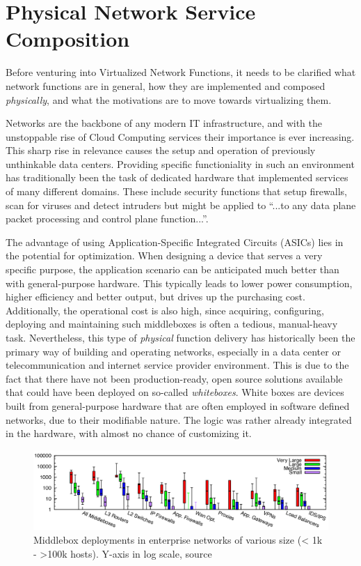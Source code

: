 \section{Physical Network Service Composition}
\label{sec:physical}
Before venturing into Virtualized Network Functions, it needs to be clarified what network functions are in general, how they are implemented and composed \textit{physically}, and what the motivations are to move towards virtualizing them. 

Networks are the backbone of any modern IT infrastructure, and with the unstoppable rise of  Cloud Computing services their importance is ever increasing. This sharp rise in relevance causes the setup and operation of previously unthinkable data centers. Providing specific functioniality in such an environment has traditionally been the task of dedicated hardware that implemented services of many different domains. These include security functions that setup firewalls, scan for viruses and detect intruders but might be applied to ``...to any data plane packet processing and control plane function...''\cite{nfv_wp}. 

The advantage of using Application-Specific Integrated Circuits (ASICs) lies in the potential for optimization. When designing a device that serves a very specific purpose, the application scenario can be anticipated much better than with general-purpose hardware. This typically leads to lower power consumption, higher efficiency and better output, but drives up the purchasing cost. Additionally, the operational cost is also high, since acquiring, configuring, deploying and maintaining such middleboxes is often a tedious, manual-heavy task. Nevertheless, this type of \textit{physical} function delivery has historically been the primary way of building and operating networks, especially in a data center or telecommunication and internet service provider environment. This is due to the fact that there have not been production-ready, open source solutions available that could have been deployed on so-called \textit{whiteboxes}. White boxes are devices built from general-purpose hardware that are often employed in software defined networks, due to their modifiable nature. The logic was rather already integrated in the hardware, with almost no chance of customizing it.


\begin{figure}[h]
	\centering
	\includegraphics[width=1\linewidth]{images/middleboxesNumbers.png}
	\caption{Middlebox deployments in enterprise networks of various size (< 1k - >100k hosts). Y-axis in log scale, source \cite{sherry2016middleboxes}}
	\label{img:middleboxesNumbers}
\end{figure}

